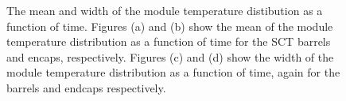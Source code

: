 \begin{figure}[h]
 	\centering
  \caption[The mean and width of the module temperature distibution as a
  function of time.]
  {The mean and width of the module temperature distibution as a
  function of time. Figures (a) and (b) show the mean of the module temperature
  distribution as a function of time for the SCT barrels and encaps,
  respectively. Figures (c) and (d) show the width of the module temperature
  distribution as a function of time, again for the barrels and endcaps
  respectively.}
	\label{fig:sigma-evo-tdiff}
\end{figure}

